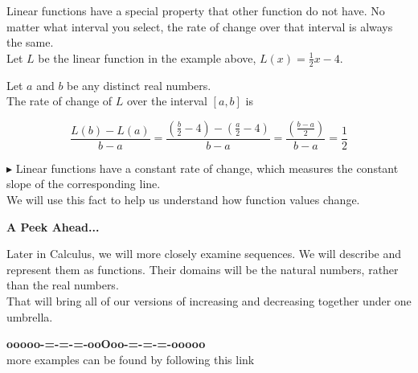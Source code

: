 \documentclass{ximera}
\begin{document}
Linear functions have a special property that other function do not have.  No matter what interval you select, the rate of change over that interval is always the same. \\



Let $L$ be the linear function in the example above, $L(x) = \frac{1}{2} x - 4$. 

Let $a$ and $b$ be any distinct real numbers. \\

The rate of change of $L$ over the interval $[a, b]$ is


\[
\frac{L(b) - L(a)}{b - a} = \frac{\left( \frac{b}{2} - 4 \right) - \left( \frac{a}{2} - 4 \right)}{b-a} 
= \frac{\left( \frac{b - a}{2} \right)}{b-a} = \frac{1}{2}
\]



\textbf{\textcolor{blue!55!black}{$\blacktriangleright$}} Linear functions have a constant rate of change, which measures the constant slope of the corresponding line. \\



We will use this fact to help us understand how function values change.



\textbf{\textcolor{red!70!black}{A Peek Ahead...}}



Later in Calculus, we will more closely examine sequences.  We will describe and represent them as functions.  Their domains will be the natural numbers, rather than the real numbers. \\


That will bring all of our versions of increasing and decreasing together under one umbrella.
































\begin{onlineOnly}
\begin{center}
\textbf{\textcolor{green!50!black}{ooooo-=-=-=-ooOoo-=-=-=-ooooo}} \\

more examples can be found by following this link\\ 

\end{center}
\end{onlineOnly}
\end{document}
